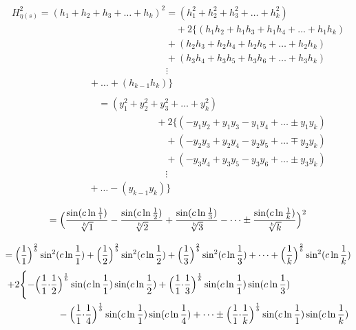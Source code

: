 \documentclass{amsart}
\begin{document}
	\[\]
	\[\]
	\[ \begin{array}{c}
		H_{\eta(s)}^2 = (h_1 + h_2 + h_3 + \dots + h_k)^2 = (h_1^2 + h_2^2 + h_3^2 + \dots + h_k^2) \\
		\qquad\qquad\qquad\qquad\qquad\qquad\qquad\qquad\quad + 2\{(h_1h_2 + h_1h_3 + h_1h_4 + \dots + h_{1}h_{k}) \\ 
		\qquad\qquad\qquad\qquad\qquad\qquad\qquad\qquad + (h_2h_3 + h_2h_4 + h_2h_5 + \dots + h_2h_{k}) \\ 
		\qquad\qquad\qquad\qquad\qquad\qquad\qquad\qquad + (h_3h_4 + h_3h_5 + h_3h_6 + \dots + h_3h_{k}) \\ 
		\qquad\qquad\qquad\qquad\qquad\qquad\qquad\qquad \vdots \\
		\qquad\qquad\qquad\qquad + \dots + (h_{k-1}h_{k}) \} \\ 
	\end{array} \]
	\[ \begin{array}{c}
		\qquad\qquad\qquad\quad = (y_1^2 + y_2^2 + y_3^2 + \dots + y_k^2) \\ 
		\qquad\qquad\qquad\qquad\qquad\qquad\quad + 2\{(-y_1y_2 + y_1y_3 - y_1y_4 + \dots \pm y_{1}y_{k}) \\ 
		\qquad\qquad\qquad\qquad\qquad\qquad\qquad + (-y_2y_3 + y_2y_4 - y_2y_5 + \dots \mp y_{2}y_{k}) \\ 
		\qquad\qquad\qquad\qquad\qquad\qquad\qquad + (-y_3y_4 + y_3y_5 - y_3y_6 + \dots \pm y_{3}y_{k}) \\ 
		\qquad\qquad\qquad\qquad\qquad\qquad\qquad \vdots \\
		\qquad\qquad\qquad + \dots - (y_{k-1}y_{k}) \} \\
	\end{array} \]
	\[\]
	\[\]
	\[ = \Bigl( \frac{\sin({c\ln \frac{1}{1}})}{\sqrt[b]{1}} - \frac{\sin({c\ln \frac{1}{2}})}{\sqrt[b]{2}} + \frac{\sin({c\ln \frac{1}{3}})}{\sqrt[b]{3}} - \dots \pm \frac{\sin({c\ln \frac{1}{k}})}{\sqrt[b]{k}} \Bigr)^2 \]
	\[\]
	\[\]
	\[ = \Bigl( \frac{1}{1} \Bigr)^{\frac2b}\sin^2({c \ln \frac{1}{1}}) + \Bigl( \frac{1}{2} \Bigr)^{\frac2b}\sin^2({c \ln \frac{1}{2}}) + \Bigl( \frac{1}{3} \Bigr)^{\frac2b}\sin^2({c \ln \frac{1}{3}}) + \dots + \Bigl( \frac{1}{k} \Bigr)^{\frac2b}\sin^2({c \ln \frac{1}{k}}) \]
	\[
	\begin{aligned}
		+2\Biggl\{ -\Bigl( \frac{1}{1} {\cdot} \frac{1}{2}& \Bigr)^\frac1b \sin(c \ln \frac{1}{1}) \sin(c \ln \frac{1}{2}) + \Bigl( \frac{1}{1} {\cdot} \frac{1}{3} \Bigr)^\frac1b \sin(c \ln \frac{1}{1}) \sin(c \ln \frac{1}{3}) \\ 
		& - \Bigl( \frac{1}{1} {\cdot} \frac{1}{4} \Bigr)^\frac1b \sin(c \ln \frac{1}{1}) \sin(c \ln \frac{1}{4}) + \dots \pm \Bigl( \frac{1}{1} {\cdot} \frac{1}{k} \Bigr)^\frac1b \sin(c \ln \frac{1}{1}) \sin(c \ln \frac{1}{k}) \\ 		
	\end{aligned}
	\]
\end{document}
